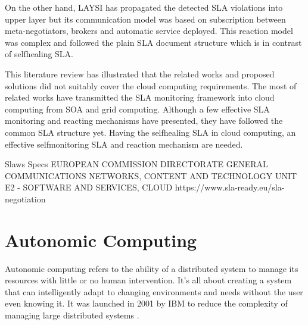 On the other hand, LAYSI \cite{5614035} has propagated the detected SLA violations into upper layer but its communication model was based on subscription between meta-negotiators, brokers
and automatic service deployed. This reaction model was complex and followed the plain SLA document structure which is in contrast of selfhealing SLA. 

This literature review has illustrated that the related works and proposed solutions did  not suitably cover the cloud computing requirements. The most of related works have transmitted the SLA monitoring framework into cloud computing from SOA and grid computing. Although a few effective SLA monitoring and reacting mechanisms have presented, they have followed the common SLA structure yet. Having the selfhealing SLA in cloud computing, an effective selfmonitoring SLA and reaction mechanism are needed.



Slaws
Specs
EUROPEAN COMMISSION DIRECTORATE GENERAL COMMUNICATIONS NETWORKS, CONTENT AND TECHNOLOGY UNIT E2 - SOFTWARE AND SERVICES, CLOUD
https://www.sla-ready.eu/sla-negotiation

\section{Autonomic Computing}
Autonomic computing refers to the ability of a distributed system to manage its resources with little or no human intervention. It's all about creating a system that can intelligently adapt to changing environments and needs without the user even knowing it. It was launched in 2001 by IBM to reduce the complexity of managing large distributed systems \cite{horn2001autonomic}.


